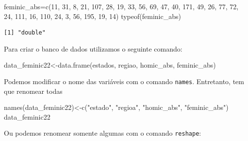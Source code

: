 \documentclass[
  letterpaper,
  DIV=11,
  numbers=noendperiod]{scrreprt}
\newenvironment{Shaded}{\begin{snugshade}}{\end{snugshade}}
\newcommand{\DecValTok}[1]{\textcolor[rgb]{0.68,0.00,0.00}{#1}}
\newcommand{\FunctionTok}[1]{\textcolor[rgb]{0.28,0.35,0.67}{#1}}
\newcommand{\NormalTok}[1]{\textcolor[rgb]{0.00,0.23,0.31}{#1}}
\newcommand{\OtherTok}[1]{\textcolor[rgb]{0.00,0.23,0.31}{#1}}
\newcommand{\StringTok}[1]{\textcolor[rgb]{0.13,0.47,0.30}{#1}}
\begin{document}
\begin{Shaded}
\begin{Highlighting}[]
\NormalTok{feminic\_abs}\OtherTok{=}\FunctionTok{c}\NormalTok{(}\DecValTok{11}\NormalTok{,  }\DecValTok{31}\NormalTok{,  }\DecValTok{8}\NormalTok{,  }\DecValTok{21}\NormalTok{,  }\DecValTok{107}\NormalTok{,  }\DecValTok{28}\NormalTok{,  }\DecValTok{19}\NormalTok{,  }\DecValTok{33}\NormalTok{,  }\DecValTok{56}\NormalTok{,  }\DecValTok{69}\NormalTok{,  }\DecValTok{47}\NormalTok{,  }\DecValTok{40}\NormalTok{,  }\DecValTok{171}\NormalTok{,  }\DecValTok{49}\NormalTok{,  }\DecValTok{26}\NormalTok{,  }\DecValTok{77}\NormalTok{,  }\DecValTok{72}\NormalTok{,  }\DecValTok{24}\NormalTok{,  }\DecValTok{111}\NormalTok{,  }\DecValTok{16}\NormalTok{,  }\DecValTok{110}\NormalTok{,  }\DecValTok{24}\NormalTok{,  }\DecValTok{3}\NormalTok{,  }\DecValTok{56}\NormalTok{,  }\DecValTok{195}\NormalTok{,  }\DecValTok{19}\NormalTok{,  }\DecValTok{14}\NormalTok{) }
\FunctionTok{typeof}\NormalTok{(feminic\_abs)}
\end{Highlighting}
\end{Shaded}

\begin{verbatim}
[1] "double"
\end{verbatim}

Para criar o banco de dados utilizamos o seguinte comando:

\begin{Shaded}
\begin{Highlighting}[]
\NormalTok{data\_feminic22}\OtherTok{\textless{}{-}}\FunctionTok{data.frame}\NormalTok{(estados, regiao, homic\_abs, feminic\_abs)  }
\end{Highlighting}
\end{Shaded}

Podemos modificar o nome das variáveis com o comando \texttt{names}.
Entretanto, tem que renomear todas

\begin{Shaded}
\begin{Highlighting}[]
\FunctionTok{names}\NormalTok{(data\_feminic22)}\OtherTok{\textless{}{-}}\FunctionTok{c}\NormalTok{(}\StringTok{"estado"}\NormalTok{, }\StringTok{"regioa"}\NormalTok{, }\StringTok{"homic\_abs"}\NormalTok{, }\StringTok{"feminic\_abs"}\NormalTok{) }
\NormalTok{data\_feminic22}
\end{Highlighting}
\end{Shaded}

Ou podemos renomear somente algumas com o comando \texttt{reshape}:
\end{document}
